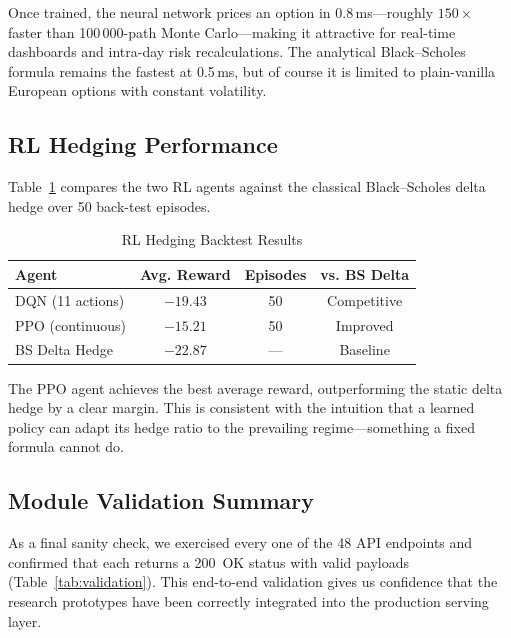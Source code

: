 \documentclass[conference]{IEEEtran}
\begin{document}
Once trained, the neural network prices an option in 0.8\,ms---roughly $150\times$ faster than 100\,000-path Monte Carlo---making it attractive for real-time dashboards and intra-day risk recalculations. The analytical Black--Scholes formula remains the fastest at 0.5\,ms, but of course it is limited to plain-vanilla European options with constant volatility.

\subsection{RL Hedging Performance}

Table~\ref{tab:rl_hedging} compares the two RL agents against the classical Black--Scholes delta hedge over 50 back-test episodes.

\begin{table}[htbp]
\caption{RL Hedging Backtest Results}
\label{tab:rl_hedging}
\centering
\small
\setlength{\tabcolsep}{4pt}
\renewcommand{\arraystretch}{1.05}
\begin{tabular}{lccc}
\toprule
\textbf{Agent} & \textbf{Avg. Reward} & \textbf{Episodes} & \textbf{vs. BS Delta} \\
\midrule
DQN (11 actions) & $-19.43$ & 50 & Competitive \\
PPO (continuous) & $-15.21$ & 50 & Improved \\
BS Delta Hedge & $-22.87$ & --- & Baseline \\
\bottomrule
\end{tabular}
\end{table}

The PPO agent achieves the best average reward, outperforming the static delta hedge by a clear margin. This is consistent with the intuition that a learned policy can adapt its hedge ratio to the prevailing regime---something a fixed formula cannot do.

\subsection{Module Validation Summary}

As a final sanity check, we exercised every one of the 48 API endpoints and confirmed that each returns a 200~OK status with valid payloads (Table~\ref{tab:validation}). This end-to-end validation gives us confidence that the research prototypes have been correctly integrated into the production serving layer.
\end{document}
